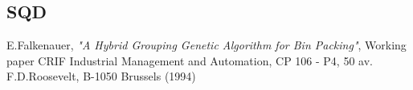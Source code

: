\documentclass{article}
\begin{document}
\subsection{SQD}
\begin{thebibliography}{9}

  E.Falkenauer,
  \textit {"A Hybrid Grouping Genetic Algorithm for Bin Packing"},
 Working paper CRIF Industrial Management and Automation, CP 106 - P4, 50
av. F.D.Roosevelt, B-1050 Brussels (1994)
\end{thebibliography}
\end{document}
